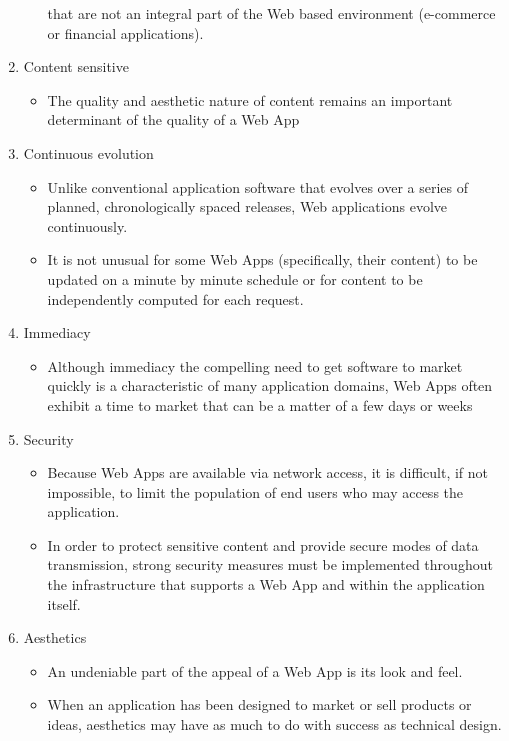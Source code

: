 \documentclass{article}
\begin{document}
\begin{enumerate}
\begin{itemize}
					that are not an integral part of the Web based environment (e-commerce or financial
					applications).
			\end{itemize}
		\item Content sensitive
			\begin{itemize}
				\item The quality and aesthetic nature of content remains an important determinant of the
					quality of a Web App
			\end{itemize}
		\item Continuous evolution
			\begin{itemize}
				\item Unlike conventional application software that evolves over a series of planned,
					chronologically spaced releases, Web applications evolve continuously.
				\item It is not unusual for some Web Apps (specifically, their content) to be updated on a
					minute by minute schedule or for content to be independently computed for each request.
			\end{itemize}
		\item Immediacy
			\begin{itemize}
				\item Although immediacy the compelling need to get software to market quickly is a
					characteristic of many application domains, Web Apps often exhibit a time to market that can
					be a matter of a few days or weeks
			\end{itemize}
		\item Security
			\begin{itemize}
				\item Because Web Apps are available via network access, it is difficult, if not impossible, to
					limit the population of end users who may access the application.
				\item In order to protect sensitive content and provide secure modes of data transmission,
					strong security measures must be implemented throughout the infrastructure that supports a
					Web App and within the application itself.
			\end{itemize}
		\item Aesthetics
			\begin{itemize}
				\item An undeniable part of the appeal of a Web App is its look and feel.
				\item When an application has been designed to market or sell products or ideas, aesthetics may
					have as much to do with success as technical design.
			\end{itemize}
	\end{enumerate} \newpage
\end{document}
